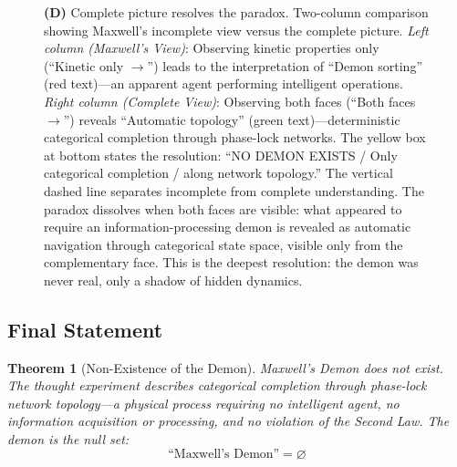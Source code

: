 \documentclass[12pt,a4paper]{article}
\newtheorem{theorem}{Theorem}[section]
\theoremstyle{definition}
\theoremstyle{remark}
\begin{document}
\begin{figure}[htbp]
{\textbf{(D)} Complete picture resolves the paradox. Two-column comparison showing Maxwell's incomplete view versus the complete picture. \textit{Left column (Maxwell's View)}: Observing kinetic properties only (``Kinetic only $\to$'') leads to the interpretation of ``Demon sorting'' (red text)—an apparent agent performing intelligent operations. \textit{Right column (Complete View)}: Observing both faces (``Both faces $\to$'') reveals ``Automatic topology'' (green text)—deterministic categorical completion through phase-lock networks. The yellow box at bottom states the resolution: ``NO DEMON EXISTS / Only categorical completion / along network topology.'' The vertical dashed line separates incomplete from complete understanding. The paradox dissolves when both faces are visible: what appeared to require an information-processing demon is revealed as automatic navigation through categorical state space, visible only from the complementary face. This is the deepest resolution: the demon was never real, only a shadow of hidden dynamics.}
\label{fig:information_complementarity}
\end{figure}

\subsection{Final Statement}

\begin{theorem}[Non-Existence of the Demon]
\label{thm:nonexistence}
Maxwell's Demon does not exist. The thought experiment describes categorical completion through phase-lock network topology—a physical process requiring no intelligent agent, no information acquisition or processing, and no violation of the Second Law. The demon is the null set:
\begin{equation}
\boxed{\text{``Maxwell's Demon''} = \varnothing}
\label{eq:demon_null}
\end{equation}
\end{theorem}
\end{document}
